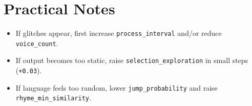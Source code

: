 \documentclass[11pt,a4paper]{article}
\begin{document}
\section{Practical Notes}
\begin{itemize}
  \item If glitches appear, first increase \texttt{process\_interval} and/or reduce \texttt{voice\_count}.
  \item If output becomes too static, raise \texttt{selection\_exploration} in small steps (\texttt{+0.03}).
  \item If language feels too random, lower \texttt{jump\_probability} and raise \texttt{rhyme\_min\_similarity}.
\end{itemize}
\end{document}
